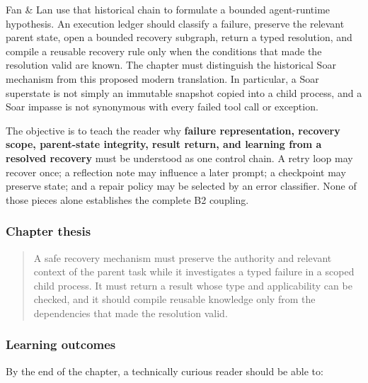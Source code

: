 Fan \& Lan use that historical chain to formulate a bounded agent-runtime hypothesis. An execution ledger should classify a failure, preserve the relevant parent state, open a bounded recovery subgraph, return a typed resolution, and compile a reusable recovery rule only when the conditions that made the resolution valid are known. The chapter must distinguish the historical Soar mechanism from this proposed modern translation. In particular, a Soar superstate is not simply an immutable snapshot copied into a child process, and a Soar impasse is not synonymous with every failed tool call or exception.

The objective is to teach the reader why \textbf{failure representation, recovery scope, parent-state integrity, result return, and learning from a resolved recovery} must be understood as one control chain. A retry loop may recover once; a reflection note may influence a later prompt; a checkpoint may preserve state; and a repair policy may be selected by an error classifier. None of those pieces alone establishes the complete B2 coupling.

\subsubsection{Chapter thesis}\label{chapter-thesis}

\begin{quote}
A safe recovery mechanism must preserve the authority and relevant context of the parent task while it investigates a typed failure in a scoped child process. It must return a result whose type and applicability can be checked, and it should compile reusable knowledge only from the dependencies that made the resolution valid.
\end{quote}

\subsubsection{Learning outcomes}\label{learning-outcomes}

By the end of the chapter, a technically curious reader should be able to:

